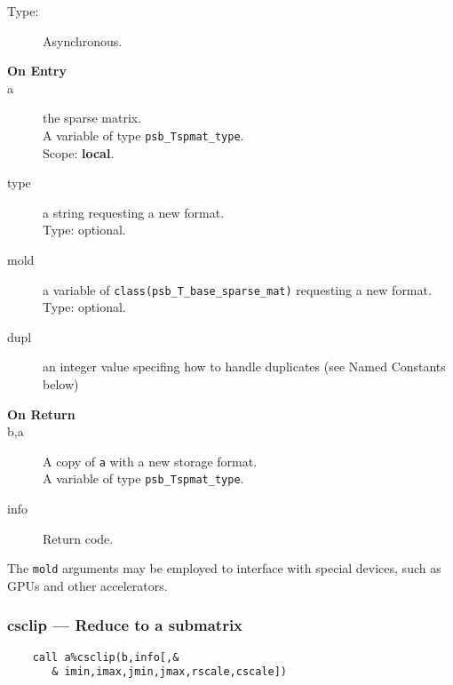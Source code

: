\begin{description}
\item[Type:] Asynchronous.
\item[\bf On Entry]
\item[a] the sparse matrix.\\
A variable of type \verb|psb_Tspmat_type|.\\
Scope: {\bf local}.\\
\item[type] a string requesting a new format.\\
Type: optional.
\item[mold] a variable of \verb|class(psb_T_base_sparse_mat)|  requesting a new format.\\
Type: optional.
\item[dupl] an integer value specifing how to handle duplicates (see
  Named Constants below)
\end{description}

\begin{description}
\item[\bf On Return]
\item[b,a] A copy  of \verb|a| with a new storage format.\\
A variable of type \verb|psb_Tspmat_type|.
\item[info] Return code. 
\end{description}
The \verb|mold|  arguments may be
employed to interface with special devices, such as GPUs and other
accelerators. 


\subsubsection*{csclip --- Reduce to a submatrix}
\begin{verbatim}
    call a%csclip(b,info[,&
       & imin,imax,jmin,jmax,rscale,cscale])
\end{verbatim}

